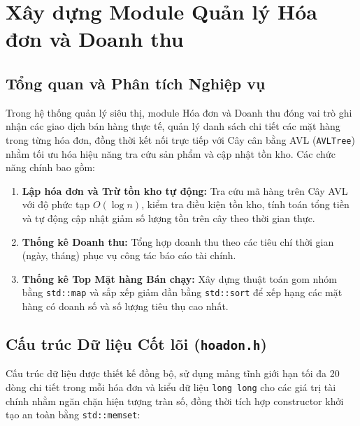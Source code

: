 \section{Xây dựng Module Quản lý Hóa đơn và Doanh thu}

\subsection{Tổng quan và Phân tích Nghiệp vụ}
Trong hệ thống quản lý siêu thị, module Hóa đơn và Doanh thu đóng vai trò ghi nhận các giao dịch bán hàng thực tế, quản lý danh sách chi tiết các mặt hàng trong từng hóa đơn, đồng thời kết nối trực tiếp với Cây cân bằng AVL (\texttt{AVLTree}) nhằm tối ưu hóa hiệu năng tra cứu sản phẩm và cập nhật tồn kho. Các chức năng chính bao gồm:
\begin{enumerate}
    \item \textbf{Lập hóa đơn và Trừ tồn kho tự động:} Tra cứu mã hàng trên Cây AVL với độ phức tạp $O(\log n)$, kiểm tra điều kiện tồn kho, tính toán tổng tiền và tự động cập nhật giảm số lượng tồn trên cây theo thời gian thực.
    \item \textbf{Thống kê Doanh thu:} Tổng hợp doanh thu theo các tiêu chí thời gian (ngày, tháng) phục vụ công tác báo cáo tài chính.
    \item \textbf{Thống kê Top Mặt hàng Bán chạy:} Xây dựng thuật toán gom nhóm bằng \texttt{std::map} và sắp xếp giảm dần bằng \texttt{std::sort} để xếp hạng các mặt hàng có doanh số và số lượng tiêu thụ cao nhất.
\end{enumerate}

\subsection{Cấu trúc Dữ liệu Cốt lõi (\texttt{hoadon.h})}
Cấu trúc dữ liệu được thiết kế đồng bộ, sử dụng mảng tĩnh giới hạn tối đa 20 dòng chi tiết trong mỗi hóa đơn và kiểu dữ liệu \texttt{long long} cho các giá trị tài chính nhằm ngăn chặn hiện tượng tràn số, đồng thời tích hợp constructor khởi tạo an toàn bằng \texttt{std::memset}:

